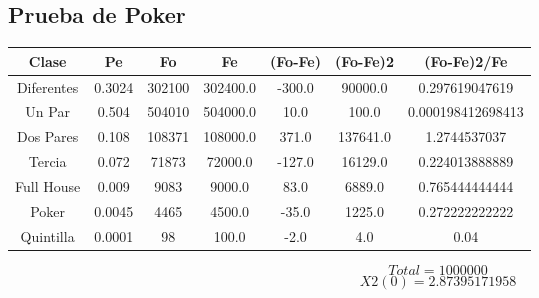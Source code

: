 \documentclass{article}
\begin{document}
\subsection{Prueba de Poker}
\begin{tabular}{|c|c|c|c|c|c|c|}
Clase&Pe&Fo&Fe&(Fo{-}Fe)&(Fo{-}Fe)2&(Fo{-}Fe)2/Fe\\
\hline
Diferentes&0.3024&302100&302400.0&{-}300.0&90000.0&0.297619047619\\
\hline
Un Par&0.504&504010&504000.0&10.0&100.0&0.000198412698413\\
\hline
Dos Pares&0.108&108371&108000.0&371.0&137641.0&1.2744537037\\
\hline
Tercia&0.072&71873&72000.0&{-}127.0&16129.0&0.224013888889\\
\hline
Full House&0.009&9083&9000.0&83.0&6889.0&0.765444444444\\
\hline
Poker&0.0045&4465&4500.0&{-}35.0&1225.0&0.272222222222\\
\hline
Quintilla&0.0001&98&100.0&{-}2.0&4.0&0.04\\
\end{tabular}
$$
Total = 1000000
$$
$$
X2(0) = 2.87395171958
$$
\end{document}
